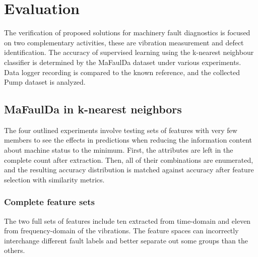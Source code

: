 \chapter{Evaluation} \label{chapter:evaluation}
The verification of proposed solutions for machinery fault diagnostics is focused on two complementary activities, these are vibration measurement and defect identification. The accuracy of supervised learning using the k-nearest neighbour classifier is determined by the MaFaulDa dataset under various experiments. Data logger recording is compared to the known reference, and the collected Pump dataset is analyzed.

\section{MaFaulDa in k-nearest neighbors}
The four outlined experiments involve testing sets of features with very few members to see the effects in predictions when reducing the information content about machine status to the minimum. First, the attributes are left in the complete count after extraction. Then, all of their combinations are enumerated, and the resulting accuracy distribution is matched against accuracy after feature selection with similarity metrics. 

\subsection{Complete feature sets}
The two full sets of features include ten extracted from time-domain and eleven from frequency-domain of the vibrations. The feature spaces can incorrectly interchange different fault labels and better separate out some groups than the others. 

